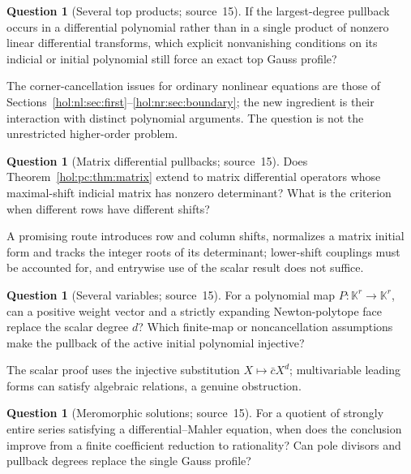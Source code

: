 \documentclass[11pt]{article}
\numberwithin{equation}{section}
\theoremstyle{definition}
\newtheorem{question}[theorem]{Question}
\theoremstyle{remark}
\newcommand{\KK}{\mathbb K}
\begin{document}
\begin{question}[Several top products; source~15]
\label{hol:pc:q:topproducts}
If the largest-degree pullback occurs in a differential polynomial rather than
in a single product of nonzero linear differential transforms, which explicit
nonvanishing conditions on its indicial or initial polynomial still force an
exact top Gauss profile?
\end{question}

The corner-cancellation issues for ordinary nonlinear equations are those of
Sections~\ref{hol:nl:sec:first}--\ref{hol:nr:sec:boundary}; the new ingredient is
their interaction with distinct polynomial arguments. The question is not the
unrestricted higher-order problem.

\begin{question}[Matrix differential pullbacks; source~15]
\label{hol:pc:q:matrix}
Does Theorem~\ref{hol:pc:thm:matrix} extend to matrix differential operators
whose maximal-shift indicial matrix has nonzero determinant? What is the
criterion when different rows have different shifts?
\end{question}

A promising route introduces row and column shifts, normalizes a matrix
initial form and tracks the integer roots of its determinant; lower-shift
couplings must be accounted for, and entrywise use of the scalar result does
not suffice.

\begin{question}[Several variables; source~15]
\label{hol:pc:q:variables}
For a polynomial map $P:\KK^r\to\KK^r$, can a positive weight vector and a
strictly expanding Newton-polytope face replace the scalar degree $d$? Which
finite-map or noncancellation assumptions make the pullback of the active
initial polynomial injective?
\end{question}

The scalar proof uses the injective substitution $X\mapsto\bar cX^d$;
multivariable leading forms can satisfy algebraic relations, a genuine
obstruction.

\begin{question}[Meromorphic solutions; source~15]
\label{hol:pc:q:meromorphic}
For a quotient of strongly entire series satisfying a differential--Mahler
equation, when does the conclusion improve from a finite coefficient reduction
to rationality? Can pole divisors and pullback degrees replace the single
Gauss profile?
\end{question}
\end{document}
